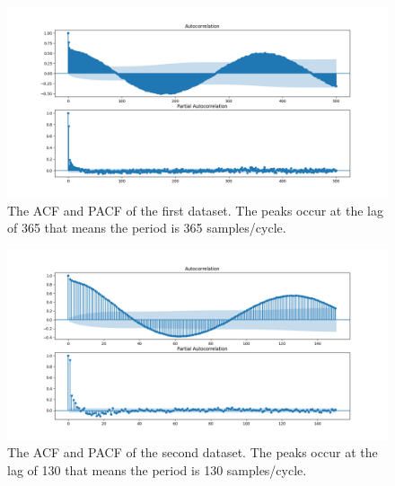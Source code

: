 \begin{figure}[H]
    \centering
    \begin{minipage}[b]{1\textwidth}
        \includegraphics[width=\textwidth]{figures/Ass1/Ass1_D1_PACF_ACF_series.png}
    \end{minipage}
    \caption{The \gls{ACF} and \gls{PACF} of the first dataset. The peaks occur at the lag of 365 that means the period is 365 samples/cycle.}
    \label{fig:Ass1_D1_PACF_ACF_series}
\end{figure}

\begin{figure}[H]
    \centering
    \begin{minipage}[b]{1\textwidth}
        \includegraphics[width=\textwidth]{figures/Ass1/Ass1_D2_PACF_ACF_series.png}
    \end{minipage}
    \caption{The \gls{ACF} and \gls{PACF} of the second dataset. The peaks occur at the lag of 130 that means the period is 130 samples/cycle.}
    \label{fig:Ass1_D2_PACF_ACF_series}
\end{figure}


